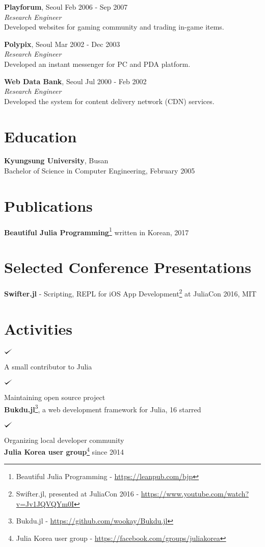 \documentclass[margin,line]{res}
\def\checkmark{\tikz\fill[scale=0.4](0,.35) -- (.25,0) -- (1,.7) -- (.25,.15) -- cycle;}
\newenvironment{list1}{
  \begin{list}{$\checkmark$}{
      \setlength{\parsep}{0in} \setlength{\parskip}{0.3cm}
      \setlength{\topsep}{0in} \setlength{\partopsep}{0.3cm}
      \setlength{\leftmargin}{0.2in}}}{\end{list}}
\begin{document}
\begin{resume}
{\bf Playforum}, Seoul \hfill Feb 2006 - Sep 2007 \\
{\em Research Engineer} \\
Developed websites for gaming community and trading in-game items.

{\bf Polypix}, Seoul \hfill Mar 2002 - Dec 2003 \\
{\em Research Engineer} \\
Developed an instant messenger for PC and PDA platform.

{\bf Web Data Bank}, Seoul \hfill Jul 2000 - Feb 2002 \\
{\em Research Engineer} \\
Developed the system for content delivery network (CDN) services.


\section{\sc Education}
{\bf Kyungsung University}, Busan \\
Bachelor of Science in Computer Engineering, February 2005


\section{\sc Publications}
{\bf Beautiful Julia Programming}\footnote{ Beautiful Julia Programming - \url{https://leanpub.com/bjp}} written in Korean, 2017


\section{\sc Selected Conference Presentations}
{\bf Swifter.jl} - Scripting, REPL for iOS App Development\footnote{ Swifter.jl, presented at JuliaCon 2016 - \url{https://www.youtube.com/watch?v=Jv1JQVQYm0I}} at JuliaCon 2016, MIT

\vspace{1.5cm}

\section{\sc Activities}

\vspace{-0.1cm}

\begin{list1}
\item A small contributor to Julia
\end{list1}

\begin{list1}
\item Maintaining open source project \\
  {\bf Bukdu.jl}\footnote{ Bukdu.jl - \url{https://github.com/wookay/Bukdu.jl}}, a web development framework for Julia, 16 starred
\end{list1}

\begin{list1}
\item Organizing local developer community \\
  {\bf Julia Korea user group}\footnote{ Julia Korea user group - \url{https://facebook.com/groups/juliakorea}} since 2014
\end{list1}

\end{resume}
\end{document}
